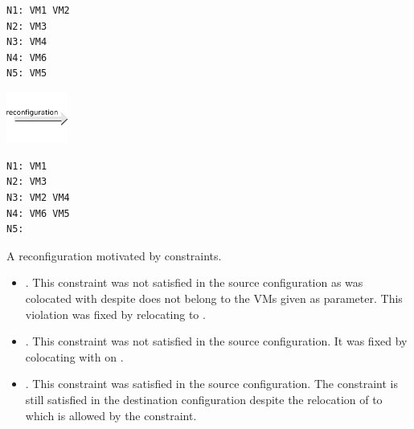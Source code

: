 \begin{reconfiguration}
\centering
\begin{minipage}[b]{0.40\textwidth}
\begin{lstlisting}
N1: VM1 VM2
N2: VM3
N3: VM4
N4: VM6
N5: VM5
\end{lstlisting}
\end{minipage}
\begin{minipage}[b]{2cm}
\includegraphics[width=2cm]{img/arrow_reconfiguration}
\end{minipage}
\begin{minipage}[b]{0.40\textwidth}
\begin{lstlisting}
N1: VM1
N2: VM3
N3: VM2 VM4
N4: VM6 VM5
N5:
\end{lstlisting}
\end{minipage}
\caption{A reconfiguration motivated by  constraints.}\label{fig: lonely}
\end{reconfiguration}

\begin{itemize}

\item {}. This constraint was not satisfied in the source configuration as 
was colocated with  despite  does not belong to the VMs given as parameter.
This violation was fixed by relocating  to .

\item {}. This constraint was not satisfied in the source configuration. It was fixed by
colocating  with  on .

\item {}. This constraint was satisfied in the source configuration.
The constraint is still satisfied in the destination configuration despite the relocation of  to
 which is allowed by the constraint.
\end{itemize}


